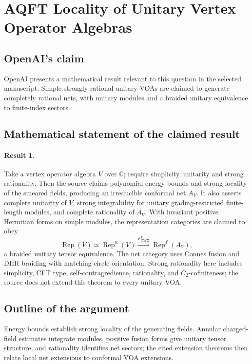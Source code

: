 \documentclass[11pt]{article}
\begin{document}
\section*{AQFT Locality of Unitary Vertex Operator Algebras}

\subsection{OpenAI's claim}
OpenAI presents a mathematical result relevant to this question in the selected manuscript. Simple strongly rational unitary VOAs are claimed to generate completely rational nets, with unitary modules and a braided unitary equivalence to finite-index sectors.

\subsection{Mathematical statement of the claimed result}
\paragraph{Result 1.} Take a vertex operator algebra \(V\) over \(\mathbb C\); require simplicity, unitarity and strong rationality. Then the source claims polynomial energy bounds and strong locality of the smeared fields, producing an irreducible conformal net \(A_V\). It also asserts complete unitarity of \(V\), strong integrability for unitary grading-restricted finite-length modules, and complete rationality of \(A_V\). With invariant positive Hermitian forms on simple modules, the representation categories are claimed to obey
\[
 \operatorname{Rep}(V)\simeq\operatorname{Rep}^{u}(V)
 \xrightarrow{F_{\mathrm{CWX}}^{V}}\operatorname{Rep}^{f}(A_V),
\]
a braided unitary tensor equivalence. The net category uses Connes fusion and DHR braiding with matching circle orientation. Strong rationality here includes simplicity, CFT type, self-contragredience, rationality, and \(C_2\)-cofiniteness; the source does not extend this theorem to every unitary VOA.

\subsection{Outline of the argument}
Energy bounds establish strong locality of the generating fields. Annular charged-field estimates integrate modules, positive fusion forms give unitary tensor structure, and rationality identifies net sectors; the cited extension theorems then relate local net extensions to conformal VOA extensions.
\end{document}
